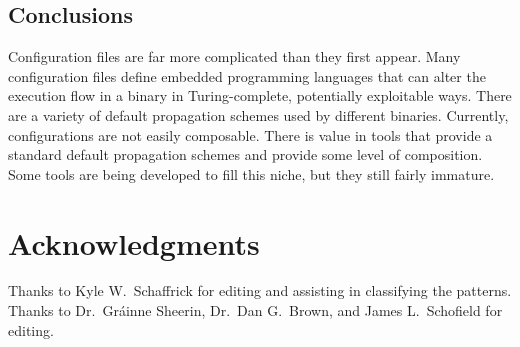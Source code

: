 \documentclass[letterpaper,twocolumn,10pt]{article}
\begin{document}
\subsection{Conclusions}

Configuration files are far more complicated than they first appear. Many configuration files define embedded programming languages that can alter the execution flow in a binary in Turing-complete, potentially exploitable ways. There are a variety of default propagation schemes used by different binaries. Currently, configurations are not easily composable. There is value in tools that provide a standard default propagation schemes and provide some level of composition. Some tools are being developed to fill this niche, but they still fairly immature.

\section{Acknowledgments}
Thanks to Kyle W.~Schaffrick for editing and assisting in classifying the patterns. Thanks to Dr.~Gr\'ainne Sheerin, Dr.~Dan G.~Brown, and James L.~Schofield for editing.

{\footnotesize 
}

\theendnotes
\end{document}
